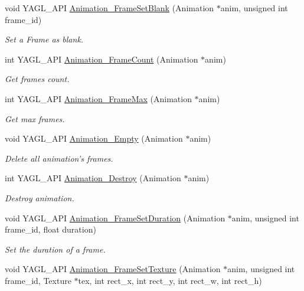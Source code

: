 \begin{DoxyCompactItemize}
void Y\-A\-G\-L\-\_\-\-A\-P\-I \hyperlink{group____animation_gaa6f90cece7b33a347a37f4adff53854e}{Animation\-\_\-\-Frame\-Set\-Blank} (Animation $\ast$anim, unsigned int frame\-\_\-id)
\begin{DoxyCompactList}\small\item\em Set a Frame as blank. \end{DoxyCompactList}\item 
int Y\-A\-G\-L\-\_\-\-A\-P\-I \hyperlink{group____animation_ga0431867830d8acab6ee19c231548fceb}{Animation\-\_\-\-Frame\-Count} (Animation $\ast$anim)
\begin{DoxyCompactList}\small\item\em Get frames count. \end{DoxyCompactList}\item 
int Y\-A\-G\-L\-\_\-\-A\-P\-I \hyperlink{group____animation_gae4d00ed7c1b1075558d203a4b6ad3c34}{Animation\-\_\-\-Frame\-Max} (Animation $\ast$anim)
\begin{DoxyCompactList}\small\item\em Get max frames. \end{DoxyCompactList}\item 
void Y\-A\-G\-L\-\_\-\-A\-P\-I \hyperlink{group____animation_ga7274d099081070aefcc61478547506df}{Animation\-\_\-\-Empty} (Animation $\ast$anim)
\begin{DoxyCompactList}\small\item\em Delete all animation's frames. \end{DoxyCompactList}\item 
int Y\-A\-G\-L\-\_\-\-A\-P\-I \hyperlink{group____animation_gae123b5273567bfb847657ff0f500c739}{Animation\-\_\-\-Destroy} (Animation $\ast$anim)
\begin{DoxyCompactList}\small\item\em Destroy animation. \end{DoxyCompactList}\item 
void Y\-A\-G\-L\-\_\-\-A\-P\-I \hyperlink{group____animation_gab60d6ad9637fd8168ebd42c4ea7c9488}{Animation\-\_\-\-Frame\-Set\-Duration} (Animation $\ast$anim, unsigned int frame\-\_\-id, float duration)
\begin{DoxyCompactList}\small\item\em Set the duration of a frame. \end{DoxyCompactList}\item 
void Y\-A\-G\-L\-\_\-\-A\-P\-I \hyperlink{group____animation_gaea854810015381a73bbcdc9f2a710e33}{Animation\-\_\-\-Frame\-Set\-Texture} (Animation $\ast$anim, unsigned int frame\-\_\-id, Texture $\ast$tex, int rect\-\_\-x, int rect\-\_\-y, int rect\-\_\-w, int rect\-\_\-h)

\end{DoxyCompactItemize}
